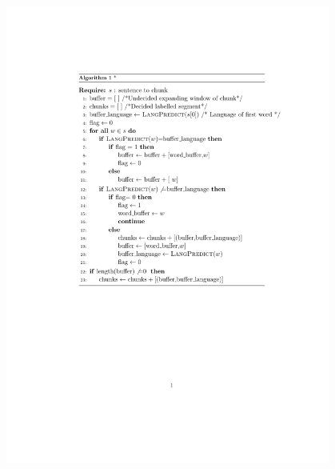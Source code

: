\documentclass[a0paper,fontscale=0.3]{baposter}  %
\begin{document}
\begin{poster}
{		%
		\includegraphics[trim = 4.4cm 11.5cm 0 4cm, clip, width=0.8\textwidth]{pseudocode.pdf}
}
\end{poster}
\end{document}
